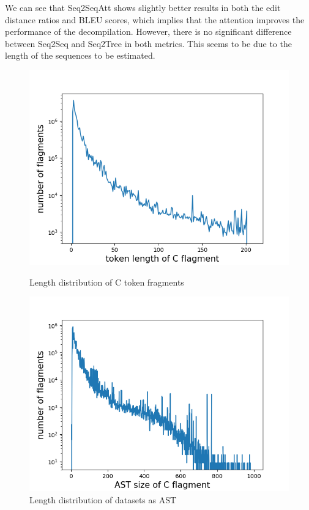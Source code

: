 \documentclass[senior,final,11pt]{iscs-thesis}
\begin{document}
We can see that Seq2SeqAtt shows slightly better results in both the edit distance ratios and BLEU scores,
 which implies that the attention improves the performance of the decompilation.
However, there is no significant difference between Seq2Seq and Seq2Tree in both metrics.
This seems to be due to the length of the sequences to be estimated.

\begin{figure}[]
	\includegraphics[width=12cm]{c_lens.png}
	\caption{Length distribution of C token fragments}
	\label{fig:csizes}
	\includegraphics[width=12cm]{ast_lens.png}
	\caption{Length distribution of datasets as AST}
	\label{fig:astsizes}
\end{figure}
\end{document}
